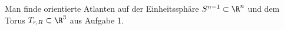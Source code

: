                     \begin{prob}[Orientieren]
Man finde orientierte Atlanten auf der Einheitssph\"are $S^{n-1}\subset\R^n$ und dem Torus $T_{r,R}\subset\R^3$ aus Aufgabe 1. 
\newpage
\vspace{2mm}
                    \end{prob}
